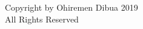 
\begin{dedication} 
\textcopyright Copyright by Ohiremen Dibua 2019 \\
All Rights Reserved
\end{dedication}